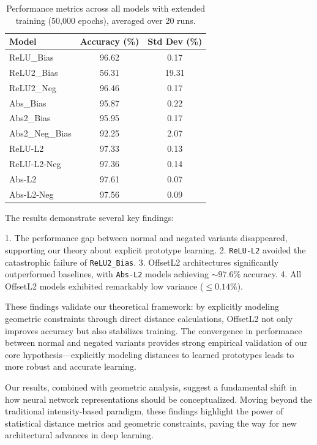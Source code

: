 \begin{table}[H]
    \centering
    \footnotesize
    \begin{tabular}{lcc}
    \toprule
    \textbf{Model} & \textbf{Accuracy (\%)} & \textbf{Std Dev (\%)} \\
    \midrule
    ReLU\_Bias & 96.62 & 0.17 \\
    ReLU2\_Bias & 56.31 & 19.31 \\
    ReLU2\_Neg & 96.46 & 0.17 \\
    Abs\_Bias & 95.87 & 0.22 \\
    Abs2\_Bias & 95.95 & 0.17 \\
    Abs2\_Neg\_Bias & 92.25 & 2.07 \\
    \midrule
    ReLU-L2 & 97.33 & 0.13 \\
    ReLU-L2-Neg & 97.36 & 0.14 \\
    Abs-L2 & 97.61 & 0.07 \\
    Abs-L2-Neg & 97.56 & 0.09 \\
    \bottomrule
    \end{tabular}
    \caption{Performance metrics across all models with extended training (50,000 epochs), averaged over 20 runs.}
    \label{tab:extended_training}
\end{table}

The results demonstrate several key findings:

1. The performance gap between normal and negated variants disappeared, supporting our theory about explicit prototype learning.
2. \texttt{ReLU-L2} avoided the catastrophic failure of \texttt{ReLU2\_Bias}.
3. OffsetL2 architectures significantly outperformed baselines, with \texttt{Abs-L2} models achieving $\sim 97.6\%$ accuracy.
4. All OffsetL2 models exhibited remarkably low variance ($\leq 0.14\%$).

These findings validate our theoretical framework: by explicitly modeling geometric constraints through direct distance calculations, OffsetL2 not only improves accuracy but also stabilizes training. The convergence in performance between normal and negated variants provides strong empirical validation of our core hypothesis—explicitly modeling distances to learned prototypes leads to more robust and accurate learning.

Our results, combined with geometric analysis, suggest a fundamental shift in how neural network representations should be conceptualized. Moving beyond the traditional intensity-based paradigm, these findings highlight the power of statistical distance metrics and geometric constraints, paving the way for new architectural advances in deep learning.
